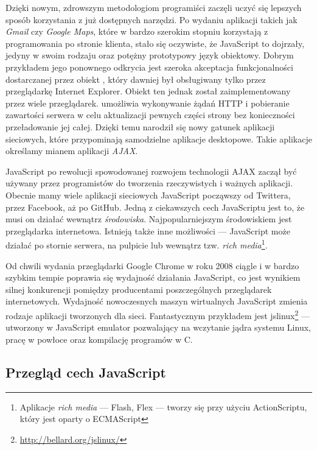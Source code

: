 Dzięki nowym, zdrowszym metodologiom programiści zaczęli uczyć się lepszych sposób korzystania z już dostępnych narzędzi. Po wydaniu aplikacji takich jak \emph{Gmail} czy \emph{Google Maps}, które w bardzo szerokim stopniu korzystają z programowania po stronie klienta, stało się oczywiste, że JavaScript to dojrzały, jedyny w swoim rodzaju oraz potężny prototypowy język obiektowy\cite{stefanov10}. Dobrym przykładem jego ponownego odkrycia jest szeroka akceptacja funkcjonalności dostarczanej przez obiekt , który dawniej był obsługiwany tylko przez przeglądarkę Internet Explorer. Obiekt ten jednak został zaimplementowany przez wiele przeglądarek.  umożliwia wykonywanie żądań HTTP i pobieranie zawartości serwera w celu aktualizacji pewnych części strony bez konieczności przeładowanie jej całej. Dzięki temu narodził się nowy gatunek aplikacji sieciowych, które przypominają samodzielne aplikacje desktopowe. Takie aplikacje określamy mianem aplikacji \emph{AJAX}.

JavaScript po rewolucji spowodowanej rozwojem technologii AJAX zaczął być używany przez programistów do tworzenia rzeczywistych i ważnych aplikacji. Obecnie mamy wiele aplikacji sieciowych JavaScript począwszy od Twittera, przez Facebook, aż po GitHub\cite{cantelon14}. Jedną z ciekawszych cech JavaScriptu jest to, że musi on działać wewnątrz \emph{środowiska}. Najpopularniejszym środowiskiem jest przeglądarka internetowa. Istnieją także inne możliwości --- JavaScript może działać po stornie serwera, na pulpicie lub wewnątrz tzw. \emph{rich media}\footnote{Aplikacje \textit{rich media} --- Flash, Flex --- tworzy się przy użyciu ActionScriptu, który jest oparty o ECMAScript}. 

Od chwili wydania przeglądarki Google Chrome w roku 2008 ciągle i w bardzo szybkim tempie poprawia się wydajność działania JavaScript, co jest wynikiem silnej konkurencji pomiędzy producentami poszczególnych przeglądarek internetowych. Wydajność nowoczesnych maszyn wirtualnych JavaScript zmienia rodzaje aplikacji tworzonych dla sieci. Fantastycznym przykładem jest jslinux\footnote{\url{http://bellard.org/jslinux/}} --- utworzony w JavaScript emulator pozwalający na wczytanie jądra systemu Linux, pracę w powłoce oraz kompilację programów w C.

\subsection{Przegląd cech JavaScript}

